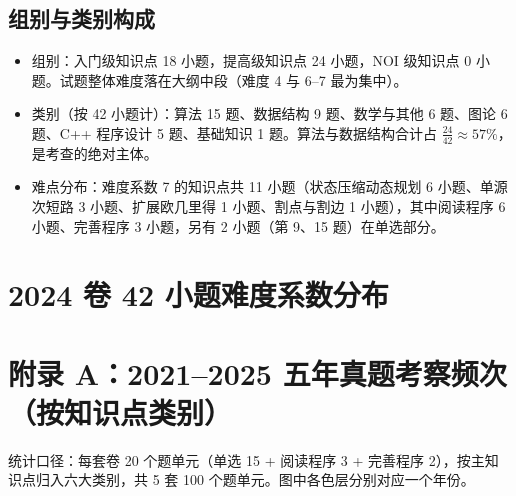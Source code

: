 \documentclass[11pt]{ctexart}
\begin{document}
\subsection{组别与类别构成}
\begin{itemize}[leftmargin=2em, itemsep=1pt]
    \item 组别：入门级知识点 18 小题，提高级知识点 24 小题，NOI 级知识点 0 小题。试题整体难度落在大纲中段（难度 4 与 6--7 最为集中）。
    \item 类别（按 42 小题计）：算法 15 题、数据结构 9 题、数学与其他 6 题、图论 6 题、C++ 程序设计 5 题、基础知识 1 题。算法与数据结构合计占 $\frac{24}{42}\approx 57\%$，是考查的绝对主体。
    \item 难点分布：难度系数 7 的知识点共 11 小题（状态压缩动态规划 6 小题、单源次短路 3 小题、扩展欧几里得 1 小题、割点与割边 1 小题），其中阅读程序 6 小题、完善程序 3 小题，另有 2 小题（第 9、15 题）在单选部分。
\end{itemize}

\section{2024 卷 42 小题难度系数分布}
\begin{center}
\end{center}

\clearpage
\appendix
\section{附录 A：2021--2025 五年真题考察频次（按知识点类别）}
统计口径：每套卷 20 个题单元（单选 15 + 阅读程序 3 + 完善程序 2），按主知识点归入六大类别，共 5 套 100 个题单元。图中各色层分别对应一个年份。
\end{document}
